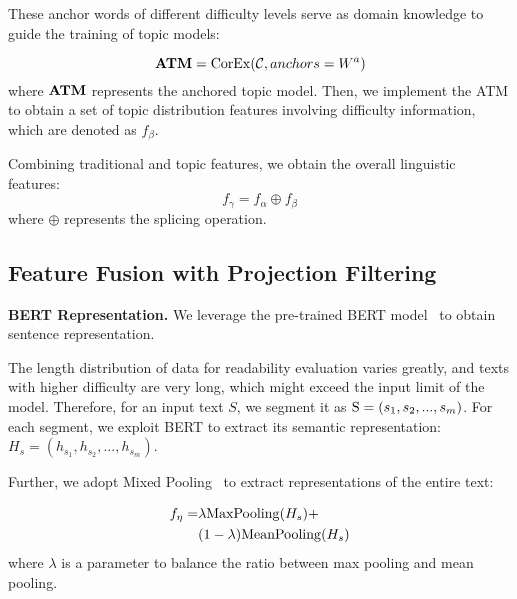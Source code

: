 \documentclass[11pt]{article}
\begin{document}
These anchor words of different difficulty levels serve as domain knowledge to guide the training of topic models:

\begin{equation}
{\rm \textbf{ATM}} = {\rm{CorEx}} (\mathcal C, anchors=W^a)
\end{equation}
where $\rm\textbf{ATM}$ represents the anchored topic model.
Then, we implement the ATM to obtain a set of topic distribution features involving difficulty information, which are denoted as $f_\beta$.


Combining traditional and topic features, we obtain the overall linguistic features:
\begin{equation}
f_\gamma = f_\alpha \oplus f_\beta
\end{equation}
where $\oplus$ represents the splicing operation.


\subsection{Feature Fusion with Projection Filtering}
\textbf{BERT Representation.} We leverage the pre-trained BERT model~\cite{devlin2018bert} to obtain sentence representation.

The length distribution of data for readability evaluation varies greatly, and texts with higher difficulty are very long, which might exceed the input limit of the model. Therefore, for an input text $S$, we segment it as $\textup{S}=(s_1, s_2,..., s_m)$. For each segment, we exploit BERT to extract its semantic representation: $H_s=(h_{s_1}, h_{s_2},..., h_{s_m})$.

Further, we adopt Mixed Pooling~\cite{yu2014mixed} to extract representations of the entire text:

\begin{equation}
\begin{aligned}
f_{\eta} = &\lambda {\rm MaxPooling}(H_{s}) + \\
&(1 - \lambda){\rm MeanPooling}(H_{s})
\end{aligned}
\label{eq:feta}
\end{equation}
where $\lambda$ is a parameter 
to balance the ratio between max pooling and mean pooling.
\end{document}

